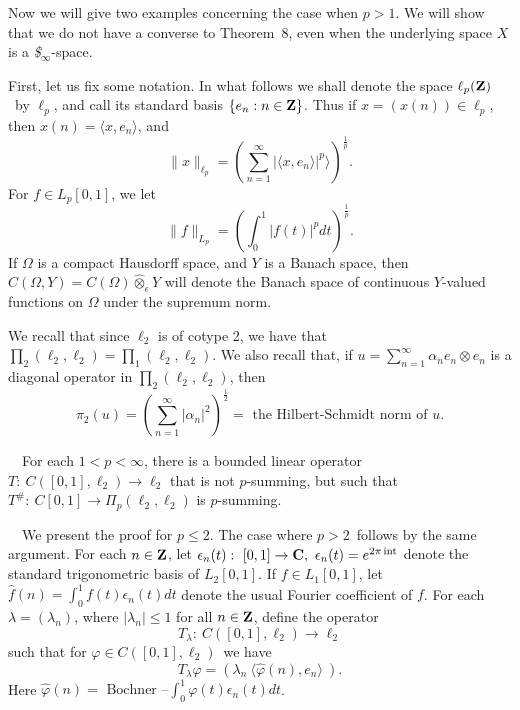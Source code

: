 \bigskip

Now we will give two examples concerning the case when $p>1$. We will 
show that
we do not have a converse to Theorem~8, even when the underlying space 
$X$
is a {\it \$}$_\infty$-space.  

\medskip

First, let us fix some notation.
In what follows we shall denote the space $\ell_p(\hbox{\bf Z})$\ by $\ell_p$, 
and
call its standard basis $\{e_n:n\in \hbox{\bf Z}\}$.  Thus if
$x=\left(x(n)\right)\in \ell_p$, then $x(n)=\langle x, e_n\rangle$, 
and
$$
\parallel x\parallel_{\ell_p}=\left(\sum\limits^\infty_{n=1}|\langle 
x,
e_n\rangle|^p\rangle\right)^{\frac 1p}.
$$
For $f\in L_p [0,1]$, we let
$$
\parallel f\parallel_{L_p}=\left(\int^1_0|f(t)|^pdt\right)^{\frac 1p}.
$$
If $\Omega$ is a compact Hausdorff space, and $Y$ is a Banach space, 
then
$C(\Omega,Y)=C(\Omega)\hat \otimes_\epsilon Y$ will denote the Banach
space of continuous $Y$-valued functions on $\Omega$ under the 
supremum
norm.  

\medskip

We recall that since $\ell_2$ is of cotype 2, we have that
$\prod_2(\ell_2,\ell_2)=\prod_1(\ell_2, \ell_2)$. We also recall that, 
if
$u=\sum\limits^\infty_{n=1}\alpha_ne_n\otimes e_n$ is a diagonal
operator in $\prod_2(\ell_2, \ell_2)$, then
$$
\pi_2(u)=\left(\sum\limits^\infty_{n=1}|\alpha_n|^2\right)^{\frac
12}=\text { the Hilbert-Schmidt norm of $u$.}
$$

\bigskip

\ \ For each $1<p<\infty$, there is a
bounded linear operator $T:\ C([0,1], \ell_2)\rightarrow
\ell_2$
that is not $p$-summing, but such that $T^\#:\ C[0,1]\longrightarrow
\Pi_p(\ell_2, \ell_2)$ is $p$-summing.

\bigskip

\ \ We present the proof for $p\le2$.
The case where $p>2$\ follows by the same argument. For each $n\in 
\hbox{\bf Z}$, let
$\epsilon_n(t):\ [0,1]\rightarrow \C,\ \epsilon_n(t)=e^{2\pi \It}$ 
denote the
standard trigonometric basis of $L_2[0,1]$.  If $f\in L_1[0,1]$, let 
$\hat
f(n)=\int^1_0f(t)\epsilon_n(t)dt$ denote the usual Fourier coefficient 
of $f$. 
For each $\lambda=(\lambda_n)$, where $|\lambda_n|\leq 1$ for all 
$n\in \hbox{\bf Z}$,
define the operator $$
T_\lambda:\ C\left([0,1], \ell_2\right)\longrightarrow \ell_2
$$
such that for $\varphi\in C\left([0,1], \ell_2\right)$\ we have
$$
T_\lambda\varphi=\left(\lambda_n\ \langle \hat \varphi (n), 
e_n\rangle\
\right).
$$
Here $\hat \varphi (n)=\text { Bochner 
--}\int^1_0\varphi(t)\epsilon_n(t)dt$. 

